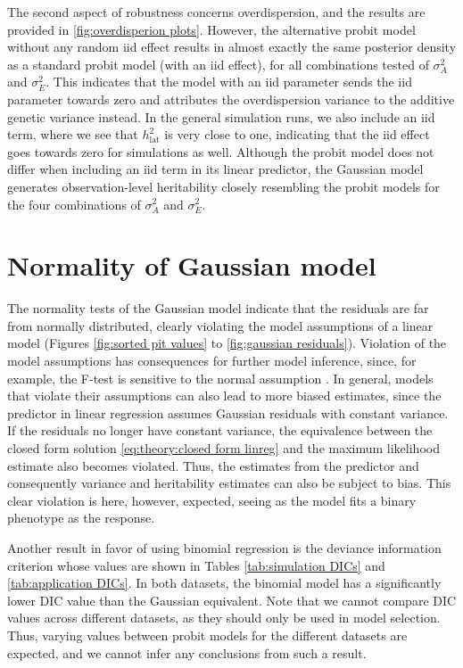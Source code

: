 The second aspect of robustness concerns overdispersion, and the results are provided in \autoref{fig:overdisperion plots}. However, the alternative probit model without any random iid effect results in almost exactly the same posterior density as a standard probit model (with an iid effect), for all combinations tested of $\sigma^2_A$ and $\sigma^2_E$. This indicates that the model with an iid parameter sends the iid parameter towards zero and attributes the overdispersion variance to the additive genetic variance instead. In the general simulation runs, we also include an iid term, where we see that $h^2_\text{lat}$ is very close to one, indicating that the iid effect goes towards zero for simulations as well. Although the probit model does not differ when including an iid term in its linear predictor, the Gaussian model generates observation-level heritability closely resembling the probit models for the four combinations of $\sigma^2_A$ and $\sigma^2_E$.

\section{Normality of Gaussian model}
The normality tests of the Gaussian model indicate that the residuals are far from normally distributed, clearly violating the model assumptions of a linear model (Figures \ref{fig:sorted pit values} to \ref{fig:gaussian residuals}). Violation of the model assumptions has consequences for further model inference, since, for example, the F-test is sensitive to the normal assumption \autocite{f-test-normality}. In general, models that violate their assumptions can also lead to more biased estimates, since the predictor in linear regression assumes Gaussian residuals with constant variance. If the residuals no longer have constant variance, the equivalence between the closed form solution \eqref{eq:theory:closed form linreg} and the maximum likelihood estimate also becomes violated. Thus, the estimates from the predictor and consequently variance and heritability estimates can also be subject to bias. This clear violation is here, however, expected, seeing as the model fits a binary phenotype as the response.

Another result in favor of using binomial regression is the deviance information criterion whose values are shown in Tables \ref{tab:simulation DICs} and \ref{tab:application DICs}. In both datasets, the binomial model has a significantly lower DIC value than the Gaussian equivalent. Note that we cannot compare DIC values across different datasets, as they should only be used in model selection. Thus, varying values between probit models for the different datasets are expected, and we cannot infer any conclusions from such a result.

